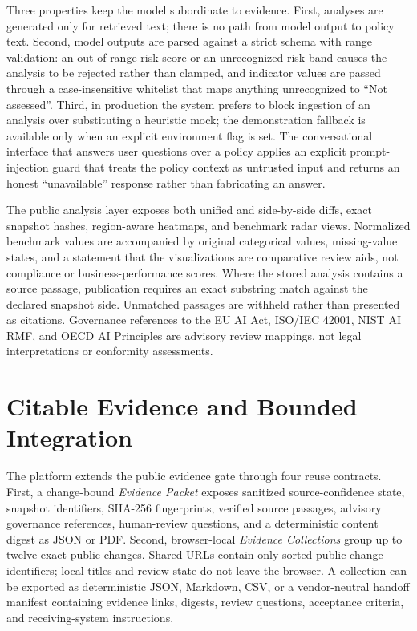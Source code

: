 \documentclass[11pt]{article}
\begin{document}
Three properties keep the model subordinate to evidence. First, analyses are
generated only for retrieved text; there is no path from model output to policy
text. Second, model outputs are parsed against a strict schema with range
validation: an out-of-range risk score or an unrecognized risk band causes the
analysis to be rejected rather than clamped, and indicator values are passed
through a case-insensitive whitelist that maps anything unrecognized to ``Not
assessed''. Third, in production the system prefers to block ingestion of an
analysis over substituting a heuristic mock; the demonstration fallback is
available only when an explicit environment flag is set. The conversational
interface that answers user questions over a policy applies an explicit
prompt-injection guard that treats the policy context as untrusted input and
returns an honest ``unavailable'' response rather than fabricating an answer.

The public analysis layer exposes both unified and side-by-side diffs, exact
snapshot hashes, region-aware heatmaps, and benchmark radar views. Normalized
benchmark values are accompanied by original categorical values, missing-value
states, and a statement that the visualizations are comparative review aids,
not compliance or business-performance scores. Where the stored analysis
contains a source passage, publication requires an exact substring match
against the declared snapshot side. Unmatched passages are withheld rather than
presented as citations. Governance references to the EU AI Act, ISO/IEC 42001,
NIST AI RMF, and OECD AI Principles are advisory review mappings, not legal
interpretations or conformity assessments.

\section{Citable Evidence and Bounded Integration}
\label{sec:delivery}

The platform extends the public evidence gate through four reuse contracts.
First, a change-bound \emph{Evidence Packet} exposes sanitized source-confidence
state, snapshot identifiers, SHA-256 fingerprints, verified source passages,
advisory governance references, human-review questions, and a deterministic
content digest as JSON or PDF. Second, browser-local \emph{Evidence Collections}
group up to twelve exact public changes. Shared URLs contain only sorted public
change identifiers; local titles and review state do not leave the browser. A
collection can be exported as deterministic JSON, Markdown, CSV, or a
vendor-neutral handoff manifest containing evidence links, digests, review
questions, acceptance criteria, and receiving-system instructions.
\end{document}
